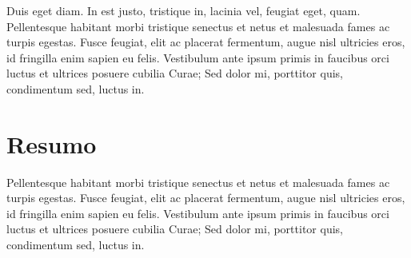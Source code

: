 Duis eget diam. In est justo, tristique in, lacinia vel, feugiat eget,
quam. Pellentesque habitant morbi tristique senectus et netus et
malesuada fames ac turpis egestas. Fusce feugiat, elit ac placerat
fermentum, augue nisl ultricies eros, id fringilla enim sapien eu
felis. Vestibulum ante ipsum primis in faucibus orci luctus et
ultrices posuere cubilia Curae; Sed dolor mi, porttitor quis,
condimentum sed, luctus in. 

\section{Resumo}

Pellentesque habitant morbi tristique senectus et netus et
malesuada fames ac turpis egestas. Fusce feugiat, elit ac placerat
fermentum, augue nisl ultricies eros, id fringilla enim sapien eu
felis. Vestibulum ante ipsum primis in faucibus orci luctus et
ultrices posuere cubilia Curae; Sed dolor mi, porttitor quis,
condimentum sed, luctus in. 
